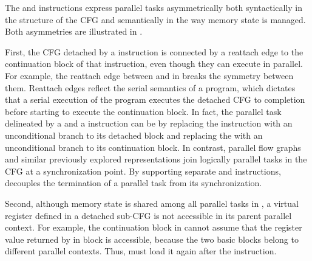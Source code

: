 The \detach and \reattach instructions express parallel tasks
asymmetrically both syntactically in the structure of the CFG and
semantically in the way memory state is managed.  Both asymmetries are
illustrated in .

First, the CFG detached by a \detach instruction is connected by a
reattach edge to the continuation block of that instruction, even
though they can execute in parallel.  For example, the reattach edge
between  and  in  breaks the
symmetry between them.  Reattach edges reflect the serial semantics of
a \tapir program, which dictates that a serial execution of the
program executes the detached CFG to completion before starting to
execute the continuation block.  In fact, the parallel task delineated
by a \detach and a \reattach instruction can be  by
replacing the \detach instruction with an unconditional branch to its
detached block and replacing the \reattach with an unconditional
branch to its continuation block.  In contrast, parallel flow graphs
and similar previously explored representations join logically
parallel tasks in the CFG at a synchronization point.  By supporting
separate \reattach and \sync instructions, \tapir decouples the
termination of a parallel task from its synchronization.






Second, although memory state is shared among all parallel tasks in
\tapir, a virtual register defined in a detached sub-CFG is not
accessible in its parent parallel context.  For example, the
continuation block  in  cannot assume
that the register value  returned by  in block
 is accessible, because the two basic blocks belong to
different parallel contexts.  Thus,  must load it again
after the \sync instruction.

